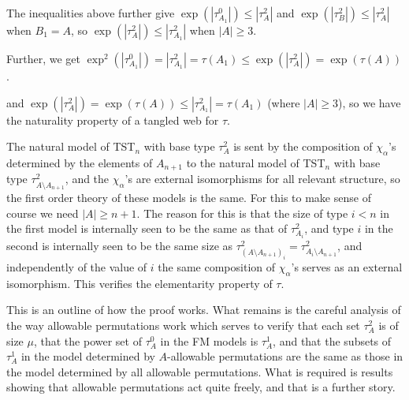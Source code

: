 \documentclass{slides}
\begin{document}
\begin{slide}

The inequalities above further give $\exp(|\tau^0_{A_1}|) \leq |\tau^2_A|$ and $\exp(|\tau^2_B|) \leq |\tau^2_A|$ when $B_1=A$, so $\exp(|\tau^2_{A}|) \leq |\tau^2_{A_1}|$ when $|A|\geq 3$.

Further, we get $\exp^2(|\tau^0_{A_1}|) = |\tau^2_{A_1}| = \tau(A_1) \leq \exp(|\tau^2_A|) = \exp(\tau(A))$.

and $\exp(|\tau^2_{A}|) = \exp(\tau(A)) \leq |\tau^2_{A_1}| = \tau(A_1)$ (where $|A| \geq 3$), so we have the naturality property of a tangled web for $\tau$.

\end{slide}

\begin{slide}

The natural model of TST$_n$ with base type $\tau^2_A$ is sent by the composition of $\chi_\alpha$'s determined by the elements of $A_{n+1}$
to the natural model of TST$_n$ with base type $\tau^2_{A \setminus A_{n+1}}$, and the $\chi_\alpha$'s are external isomorphisms for all relevant structure, so the first order theory of these models is the same.  For this to make sense of course we need $|A| \geq n+1$.
The reason for this is that the size of type $i<n$ in the first model is internally seen to be the same as that of $\tau^2_{A_i}$, and type $i$ in the  second is internally seen to be the same size
as  $\tau^2_{(A \setminus A_{n+1})_i} = \tau^2_{A_i \setminus A_{n+1}}$, and independently of the value of $i$ the same composition of $\chi_\alpha$'s serves as an external isomorphism.
This verifies the elementarity property of $\tau$.

\end{slide}

\begin{slide}

This is an outline of how the proof works.  What remains is the careful analysis of the way allowable permutations work which serves to verify that
each set $\tau^2_A$ is of size $\mu$, that the power set of $\tau^0_A$ in the FM models is $\tau^1_A$,  and that the subsets of $\tau^1_A$ in the model determined by $A$-allowable permutations are the same as those in the model
determined by all allowable permutations.  What is required is results showing that allowable permutations act quite freely, and that is a further story.

\end{slide}
\end{document}

